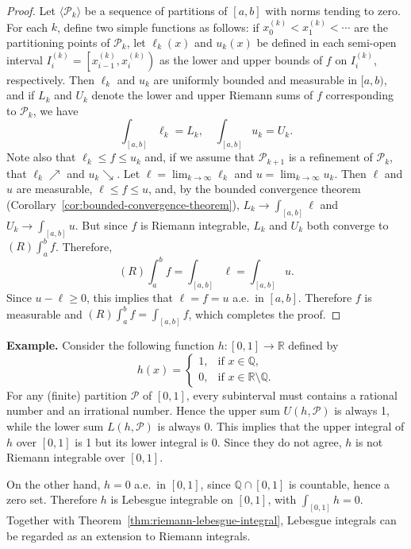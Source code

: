 \documentclass[11pt]{article}
\begin{document}
\begin{proof}
  Let $\langle \mathcal{P}_k \rangle$ be a sequence of partitions of $[a,b]$ with norms tending to zero.  For each $k$, define two simple functions as follows: if $x_0^{(k)} < x_1^{(k)} < \cdots$ are the partitioning points of $\mathcal{P}_k$, let $\ell_k(x)$ and $u_k(x)$ be defined in each semi-open interval $I_i^{(k)} = \left[x_{i-1}^{(k)}, x_i^{(k)}\right)$ as the lower and upper bounds of $f$ on $I_i^{(k)}$, respectively.  Then $\ell_k$ and $u_k$ are uniformly bounded and measurable in $[a,b)$, and if $L_k$ and $U_k$ denote the lower and upper Riemann sums of $f$ corresponding to $\mathcal{P}_k$, we have
  \[
    \int_{[a,b]} \ell_k = L_k, \quad \int_{[a,b]} u_k = U_k.
  \]
  Note also that $\ell_k \leqslant f \leqslant u_k$ and, if we assume that $\mathcal{P}_{k+1}$ is a refinement of $\mathcal{P}_k$, that $\ell_k \nearrow$ and $u_k \searrow$.  Let $\ell = \lim_{k \to \infty} \ell_k$ and $u = \lim_{k \to \infty} u_k$.  Then $\ell$ and $u$ are measurable, $\ell \leqslant f \leqslant u$, and, by the bounded convergence theorem (Corollary~\ref{cor:bounded-convergence-theorem}), $L_k \to \int_{[a,b]} \ell$ and $U_k \to \int_{[a,b]} u$.  But since $f$ is Riemann integrable, $L_k$ and $U_k$ both converge to $(R) \int_a^b f$.  Therefore,
  \[
    (R) \int_a^b f = \int_{[a,b]} \ell = \int_{[a,b]} u.
  \]
  Since $u - \ell \geqslant 0$, this implies that $\ell = f = u$ a.e.\ in $[a,b]$.  Therefore $f$ is measurable and $(R) \int_a^b f = \int_{[a,b]} f$, which completes the proof.
\end{proof}

\noindent\textbf{Example.} Consider the following function $h : [0,1] \to \mathbb{R}$ defined by
\[
  h(x) = 
  \begin{cases}
    1, & \text{if $x \in \mathbb{Q}$}, \\
    0, & \text{if $x \in \mathbb{R} \setminus \mathbb{Q}$}.
  \end{cases}
\]
For any (finite) partition $\mathcal{P}$ of $[0,1]$, every subinterval must contains a rational number and an irrational number.  Hence the upper sum $U(h, \mathcal{P})$ is always 1, while the lower sum $L(h,\mathcal{P})$ is always $0$.  This implies that the upper integral of $h$ over $[0,1]$ is 1 but its lower integral is 0.  Since they do not agree, $h$ is not Riemann integrable over $[0,1]$.

On the other hand, $h = 0$ a.e.\ in $[0,1]$, since $\mathbb{Q} \cap [0,1]$ is countable, hence a zero set.  Therefore $h$ is Lebesgue integrable on $[0,1]$, with $\int_{[0,1]} h = 0$.  Together with Theorem~\ref{thm:riemann-lebesgue-integral}, Lebesgue integrals can be regarded as an extension to Riemann integrals.
\end{document}
